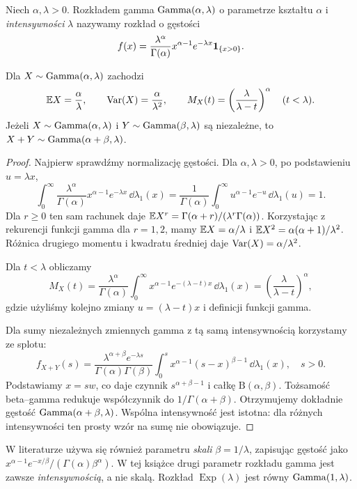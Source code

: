 \begin{definicja}
Niech $\alpha,\lambda>0$. Rozkładem gamma $\operatorname{Gamma}(\alpha,\lambda)$
o parametrze kształtu $\alpha$ i \emph{intensywności} $\lambda$
nazywamy rozkład o gęstości
\begin{equation}\label{eq:gamma}
f(x)=\frac{\lambda^\alpha}{\Gamma(\alpha)}
 x^{\alpha-1}e^{-\lambda x}\mathbf{1}_{\{x>0\}}.
\end{equation}
\end{definicja}

\begin{stwierdzenie}
Dla $X\sim\operatorname{Gamma}(\alpha,\lambda)$ zachodzi
\[
\mathbb{E} X=\frac\alpha\lambda,\qquad
\operatorname{Var}(X)=\frac\alpha{\lambda^2},\qquad
M_X(t)=\left(\frac\lambda{\lambda-t}\right)^\alpha\quad(t<\lambda).
\]
Jeżeli $X\sim\operatorname{Gamma}(\alpha,\lambda)$ i
$Y\sim\operatorname{Gamma}(\beta,\lambda)$ są niezależne, to
$X+Y\sim\operatorname{Gamma}(\alpha+\beta,\lambda)$.
\end{stwierdzenie}
\begin{proof}
Najpierw sprawdźmy normalizację gęstości. Dla
$\alpha,\lambda>0$, po podstawieniu $u=\lambda x$,
\[
\int_0^\infty\frac{\lambda^\alpha}{\Gamma(\alpha)}
 x^{\alpha-1}e^{-\lambda x}\,\dd\lambda_1(x)
=\frac1{\Gamma(\alpha)}\int_0^\infty
u^{\alpha-1}e^{-u}\,\dd\lambda_1(u)=1.
\]
Dla $r\geq0$ ten sam rachunek daje
$\mathbb{E} X^r=\Gamma(\alpha+r)/(\lambda^r\Gamma(\alpha))$.
Korzystając z rekurencji funkcji gamma dla $r=1,2$,
mamy $\mathbb{E} X=\alpha/\lambda$ i
$\mathbb{E} X^2=\alpha(\alpha+1)/\lambda^2$.
Różnica drugiego momentu i kwadratu średniej daje
$\operatorname{Var}(X)=\alpha/\lambda^2$.

Dla $t<\lambda$ obliczamy
\[
M_X(t)=\frac{\lambda^\alpha}{\Gamma(\alpha)}
\int_0^\infty x^{\alpha-1}e^{-(\lambda-t)x}
\,\dd\lambda_1(x)
=\left(\frac{\lambda}{\lambda-t}\right)^\alpha,
\]
gdzie użyliśmy kolejno zmiany $u=(\lambda-t)x$
i definicji funkcji gamma.

Dla sumy niezależnych zmiennych gamma z tą samą
intensywnością korzystamy ze splotu:
\[
f_{X+Y}(s)=\frac{\lambda^{\alpha+\beta}e^{-\lambda s}}
{\Gamma(\alpha)\Gamma(\beta)}
\int_0^s x^{\alpha-1}(s-x)^{\beta-1}\,\dd\lambda_1(x),
\quad s>0.
\]
Podstawiamy $x=sw$, co daje czynnik
$s^{\alpha+\beta-1}$ i całkę $\mathrm B(\alpha,\beta)$.
Tożsamość beta--gamma redukuje współczynnik do
$1/\Gamma(\alpha+\beta)$. Otrzymujemy dokładnie
gęstość $\operatorname{Gamma}(\alpha+\beta,\lambda)$.
Wspólna intensywność jest istotna: dla różnych
intensywności ten prosty wzór na sumę nie obowiązuje.
\end{proof}

\begin{uwaga}
W literaturze używa się również parametru \emph{skali}
$\beta=1/\lambda$, zapisując gęstość jako
$x^{\alpha-1}e^{-x/\beta}/(\Gamma(\alpha)\beta^\alpha)$.
W tej książce drugi parametr rozkładu gamma jest zawsze
\emph{intensywnością}, a nie skalą.
Rozkład $\operatorname{Exp}(\lambda)$ jest równy $\operatorname{Gamma}(1,\lambda)$.
\end{uwaga}

